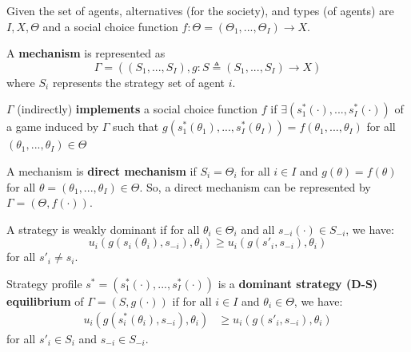 \documentclass[11pt]{elegantbook}
\begin{document}
Given the set of agents, alternatives (for the society), and types (of agents) are $I, X, \Theta$ and a social choice function $f:\Theta=(\Theta_1,...,\Theta_I) \rightarrow X$.

\begin{definition}[Mechanism]
    \normalfont
    A \textbf{mechanism} is represented as $$\Gamma=\left((S_1,...,S_I), g:S\triangleq(S_1,...,S_I) \rightarrow X\right)$$
    where $S_i$ represents the strategy set of agent $i$.
\end{definition}

\begin{definition}[Implement]
    \normalfont
    $\Gamma$ (indirectly) \textbf{implements} a social choice function $f$ if $\exists \left(s_1^*(\cdot),...,s_I^*(\cdot)\right)$ of a game induced by $\Gamma$ such that $g(s_1^*(\theta_1),...,s_I^*(\theta_I))=f(\theta_1,...,\theta_I)$ for all $(\theta_1,...,\theta_I)\in \Theta$
\end{definition}

\begin{definition}
    \normalfont
    A mechanism is \textbf{direct mechanism} if $S_i=\Theta_i$ for all $i\in I$ and $g(\theta)=f(\theta)$ for all $\theta=(\theta_1,...,\theta_I)\in\Theta$. So, a direct mechanism can be represented by $\Gamma=(\Theta,f(\cdot))$.
\end{definition}

\begin{definition}
    \normalfont
    A strategy is weakly dominant if for all $\theta_i\in\Theta_i$ and all $s_{-i}(\cdot)\in S_{-i}$, we have:
    $$u_i(g(s_i(\theta_i),s_{-i}),\theta_i)\geq u_i(g(s'_i,s_{-i}),\theta_i)$$
    for all $s'_i\neq s_i$.
\end{definition}

\begin{definition}
    \normalfont
    Strategy profile $s^*=(s_1^*(\cdot),...,s_I^*(\cdot))$ is a \textbf{dominant strategy (D-S) equilibrium} of $\Gamma=(S,g(\cdot))$ if for all $i\in I$ and $\theta_i\in \Theta$, we have:
    \begin{equation}
        \begin{aligned}
            u_i(g(s_i^*(\theta_i),s_{-i}),\theta_i)&\geq u_i(g(s'_i,s_{-i}),\theta_i)
        \end{aligned}
        \nonumber
    \end{equation}
    for all $s'_i\in S_i$ and $s_{-i}\in S_{-i}$.
\end{definition}
\end{document}
